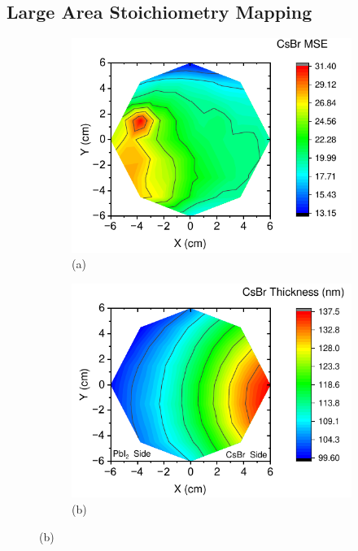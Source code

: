 \subsection{Large Area Stoichiometry Mapping}


\begin{figure}[ht!]
    \centering
    \begin{subfigure}[t]{0.49\textwidth}
        \centering
        \includegraphics[width=\textwidth]{chapters/stability/imeges/CsBrMSE.pdf} %
        \caption*{(a)}
    \end{subfigure}
    \hfill
    \begin{subfigure}[t]{0.49\textwidth}
        \centering
        \includegraphics[width=\textwidth]{chapters/stability/imeges/CsBrThickness.pdf} %
        \caption*{(b)}
    \end{subfigure}



\end{figure}
